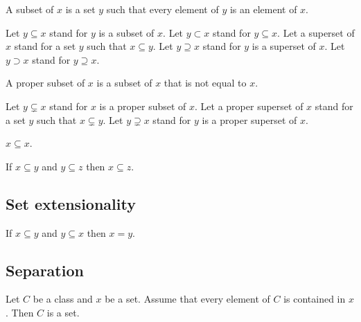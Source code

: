\documentclass[../../sets-and-functions.ftl.tex]{subfiles}
\begin{document}
  \begin{forthel}
    \begin{definition}
      A subset of $x$ is a set $y$ such that every element of $y$ is an element of $x$.
    \end{definition}

    Let $y \subseteq x$ stand for $y$ is a subset of $x$.
    Let $y \subset x$ stand for $y \subseteq x$.
    Let a superset of $x$ stand for a set $y$ such that $x \subseteq y$.
    Let $y \supseteq x$ stand for $y$ is a superset of $x$.
    Let $y \supset x$ stand for $y \supseteq x$.

    \begin{definition}
      A proper subset of $x$ is a subset of $x$ that is not equal to $x$.
    \end{definition}

    Let $y \subsetneq x$ stand for $x$ is a proper subset of $x$.
    Let a proper superset of $x$ stand for a set $y$ such that $x \subsetneq y$.
    Let $y \supsetneq x$ stand for $y$ is a proper superset of $x$.

    \begin{proposition}\label{SetTheory_01_01_375611}
      $x \subseteq x$.
    \end{proposition}

    \begin{proposition}\label{SetTheory_01_01_726162}
      If $x \subseteq y$ and $y \subseteq z$ then $x \subseteq z$.
    \end{proposition}
  \end{forthel}


  \subsection{Set extensionality}

  \begin{forthel}
    \begin{axiom}\label{SetTheory_01_01_253735}
      If $x \subseteq y$ and $y \subseteq x$ then $x = y$.
    \end{axiom}
  \end{forthel}


  \subsection{Separation}

  \begin{forthel}
    \begin{axiom}[Separation]\label{SetTheory_01_01_240572}
      Let $C$ be a class and $x$ be a set.
      Assume that every element of $C$ is contained in $x$.
      Then $C$ is a set.
    \end{axiom}
  \end{forthel}
\end{document}
